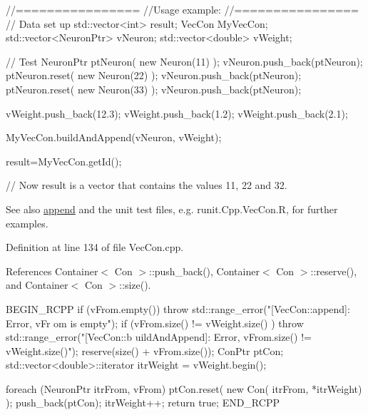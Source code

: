 \begin{DoxyCode}
        //================
        //Usage example:
        //================
        // Data set up
                std::vector<int> result;
                VecCon MyVecCon;
                std::vector<NeuronPtr> vNeuron;
                std::vector<double> vWeight;


        // Test
                NeuronPtr ptNeuron( new Neuron(11) );
                vNeuron.push_back(ptNeuron);
                ptNeuron.reset( new Neuron(22) );
                vNeuron.push_back(ptNeuron);
                ptNeuron.reset( new Neuron(33) );
                vNeuron.push_back(ptNeuron);

                vWeight.push_back(12.3);
                vWeight.push_back(1.2);
                vWeight.push_back(2.1);

                MyVecCon.buildAndAppend(vNeuron, vWeight);

                result=MyVecCon.getId();

        // Now result is a vector that contains the values 11, 22 and 32.
\end{DoxyCode}


\begin{DoxySeeAlso}{See also}
\hyperlink{class_container_ae763eb37b721d401327c97016fb2fa54}{append} and the unit test files, e.g. runit.Cpp.VecCon.R, for further examples. 
\end{DoxySeeAlso}


Definition at line 134 of file VecCon.cpp.



References Container$<$ Con $>$::push\_\-back(), Container$<$ Con $>$::reserve(), and Container$<$ Con $>$::size().


\begin{DoxyCode}
                                                                                 
             {
        BEGIN_RCPP
        if (vFrom.empty()) { throw std::range_error("[VecCon::append]: Error, vFr
      om is empty"); }
        if (vFrom.size() != vWeight.size() ) { throw std::range_error("[VecCon::b
      uildAndAppend]: Error, vFrom.size() != vWeight.size()"); }
        reserve(size() + vFrom.size());
        ConPtr ptCon;
        std::vector<double>::iterator itrWeight = vWeight.begin();

        foreach (NeuronPtr itrFrom, vFrom){
                ptCon.reset(  new Con( itrFrom, *itrWeight) );
                push_back(ptCon);
                itrWeight++;
        }
        return true;
        END_RCPP
}
\end{DoxyCode}


